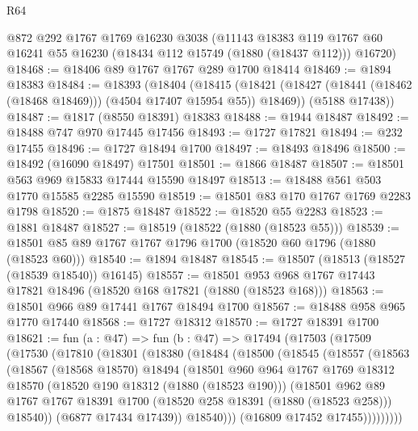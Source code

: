 \begin{lexlean}{R64}
\begin{coremodule}
    @872
    @292
    @1767
    @1769
    @16230
    @3038
    (@11143
      @18383
      @119
      @1767
      @60
      @16241
      @55
      @16230
      (@18434 @112 @15749 (@1880 (@18437 @112)))
      @16720)
@18468 := @18406 @89 @1767 @1767 @289 @1700 @18414
@18469 := @1894 @18383
@18484 := @18393
    (@18404
      (@18415 (@18421 (@18427 (@18441 (@18462 (@18468 @18469))) (@4504 @17407 @15954 @55)) @18469))
      (@5188 @17438))
@18487 := @1817 (@8550 @18391) @18383
@18488 := @1944 @18487
@18492 := @18488 @747 @970 @17445 @17456
@18493 := @1727 @17821
@18494 := @232 @17455
@18496 := @1727 @18494 @1700
@18497 := @18493 @18496
@18500 := @18492 (@16090 @18497) @17501
@18501 := @1866 @18487
@18507 := @18501 @563 @969 @15833 @17444 @15590 @18497
@18513 := @18488 @561 @503 @1770 @15585 @2285 @15590
@18519 := @18501 @83 @170 @1767 @1769 @2283 @1798
@18520 := @1875 @18487
@18522 := @18520 @55 @2283
@18523 := @1881 @18487
@18527 := @18519 (@18522 (@1880 (@18523 @55)))
@18539 := @18501 @85 @89 @1767 @1767 @1796 @1700 (@18520 @60 @1796 (@1880 (@18523 @60)))
@18540 := @1894 @18487
@18545 := @18507 (@18513 (@18527 (@18539 @18540)) @16145)
@18557 := @18501 @953 @968 @1767 @17443 @17821 @18496 (@18520 @168 @17821 (@1880 (@18523 @168)))
@18563 := @18501 @966 @89 @17441 @1767 @18494 @1700
@18567 := @18488 @958 @965 @1770 @17440
@18568 := @1727 @18312
@18570 := @1727 @18391 @1700
@18621 := fun (a : @47) =>
  fun (b : @47) =>
  @17494
    (@17503
      (@17509
        (@17530
          (@17810
            (@18301
              (@18380
                (@18484
                  (@18500
                    (@18545
                      (@18557
                        (@18563
                          (@18567
                            (@18568 @18570)
                            @18494
                            (@18501
                              @960
                              @964
                              @1767
                              @1769
                              @18312
                              @18570
                              (@18520 @190 @18312 (@1880 (@18523 @190)))
                              (@18501
                                @962
                                @89
                                @1767
                                @1767
                                @18391
                                @1700
                                (@18520 @258 @18391 (@1880 (@18523 @258)))
                                @18540))
                            (@6877 @17434 @17439))
                          @18540)))
                    (@16809 @17452 @17455)))))))))

\end{coremodule}
\end{lexlean}
